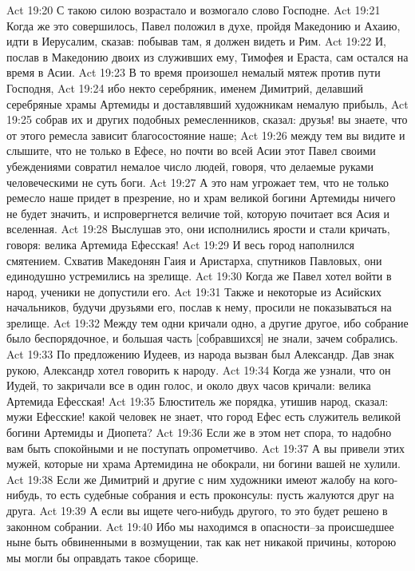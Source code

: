 Act 19:20  С такою силою возрастало и возмогало слово Господне.
Act 19:21  Когда же это совершилось, Павел положил в духе, пройдя Македонию и Ахаию, идти в Иерусалим, сказав: побывав там, я должен видеть и Рим.
Act 19:22  И, послав в Македонию двоих из служивших ему, Тимофея и Ераста, сам остался на время в Асии.
Act 19:23  В то время произошел немалый мятеж против пути Господня,
Act 19:24  ибо некто серебряник, именем Димитрий, делавший серебряные храмы Артемиды и доставлявший художникам немалую прибыль,
Act 19:25  собрав их и других подобных ремесленников, сказал: друзья! вы знаете, что от этого ремесла зависит благосостояние наше;
Act 19:26  между тем вы видите и слышите, что не только в Ефесе, но почти во всей Асии этот Павел своими убеждениями совратил немалое число людей, говоря, что делаемые руками человеческими не суть боги.
Act 19:27  А это нам угрожает тем, что не только ремесло наше придет в презрение, но и храм великой богини Артемиды ничего не будет значить, и испровергнется величие той, которую почитает вся Асия и вселенная.
Act 19:28  Выслушав это, они исполнились ярости и стали кричать, говоря: велика Артемида Ефесская!
Act 19:29  И весь город наполнился смятением. Схватив Македонян Гаия и Аристарха, спутников Павловых, они единодушно устремились на зрелище.
Act 19:30  Когда же Павел хотел войти в народ, ученики не допустили его.
Act 19:31  Также и некоторые из Асийских начальников, будучи друзьями его, послав к нему, просили не показываться на зрелище.
Act 19:32  Между тем одни кричали одно, а другие другое, ибо собрание было беспорядочное, и большая часть [собравшихся] не знали, зачем собрались.
Act 19:33  По предложению Иудеев, из народа вызван был Александр. Дав знак рукою, Александр хотел говорить к народу.
Act 19:34  Когда же узнали, что он Иудей, то закричали все в один голос, и около двух часов кричали: велика Артемида Ефесская!
Act 19:35  Блюститель же порядка, утишив народ, сказал: мужи Ефесские! какой человек не знает, что город Ефес есть служитель великой богини Артемиды и Диопета?
Act 19:36  Если же в этом нет спора, то надобно вам быть спокойными и не поступать опрометчиво.
Act 19:37  А вы привели этих мужей, которые ни храма Артемидина не обокрали, ни богини вашей не хулили.
Act 19:38  Если же Димитрий и другие с ним художники имеют жалобу на кого-нибудь, то есть судебные собрания и есть проконсулы: пусть жалуются друг на друга.
Act 19:39  А если вы ищете чего-нибудь другого, то это будет решено в законном собрании.
Act 19:40  Ибо мы находимся в опасности--за происшедшее ныне быть обвиненными в возмущении, так как нет никакой причины, которою мы могли бы оправдать такое сборище.
